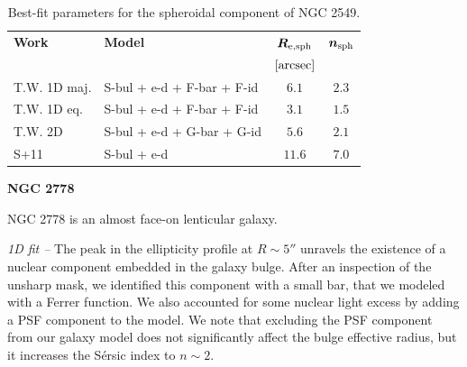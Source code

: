 \documentclass[preprint2]{emulateapj}
\begin{document}
  \begin{table}[h]
  \small
  \caption{Best-fit parameters for the spheroidal component of NGC 2549.}
  \begin{center}
  \begin{tabular}{llcc}
  \hline
  {\bf Work} & {\bf Model}   & $\bm R_{\rm e,sph}$    & $\bm n_{\rm sph}$ \\
    &  &  $[\rm arcsec]$ & \\
  \hline
  T.W. 1D maj. & S-bul + e-d + F-bar + F-id & $6.1$  &  $2.3$ \\
  T.W. 1D eq.  & S-bul + e-d + F-bar + F-id & $3.1$  &  $1.5$ \\
  T.W. 2D      & S-bul + e-d + G-bar + G-id & $5.6$  &  $2.1$ \\
  \hline
  S+11         & S-bul + e-d & $11.6$  &  $7.0$ \\
  \hline
  \end{tabular}
  \end{center}
  \label{tab:n2549}
  \end{table}


  \clearpage\newpage\noindent
  {\bf NGC 2778 \\}

  NGC 2778 is an almost face-on lenticular galaxy. 


  \emph{1D fit -- }
  The peak in the ellipticity profile at $R \sim 5''$ unravels the existence of a nuclear component 
  embedded in the galaxy bulge.
  After an inspection of the unsharp mask, we identified this component with a small bar,
  that we modeled with a Ferrer function.
  We also accounted for some nuclear light excess by adding a PSF component to the model.
  We note that excluding the PSF component from our galaxy model does not significantly affect the 
  bulge effective radius, but it increases the S\'ersic index to $n \sim 2$.
\end{document}
